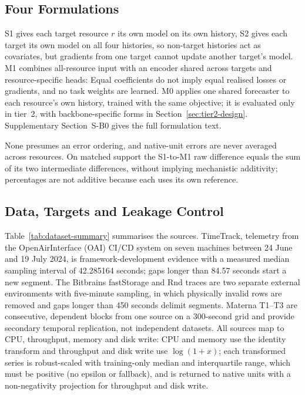 \subsection{Four Formulations}
\label{sec:formulations}
\label{sec:s1}
\label{sec:s2}
\label{sec:m1}
\label{sec:m0}

S1 gives each target resource $r$ its own model on its own history,
S2 gives each target its own model on all four histories,
so non-target histories act as covariates, but gradients from one target
cannot update another target's model. M1 combines all-resource input with an
encoder shared across targets and resource-specific heads:
Equal coefficients do not imply equal realised losses or gradients, and no
task weights are learned. M0 applies one shared forecaster to each resource's
own history,
trained with the same objective; it is evaluated only in tier~2, with
backbone-specific forms in Section~\ref{sec:tier2-design}. Supplementary
Section~S-B0 gives the full formulation text.

None presumes an error ordering, and native-unit errors are never averaged
across resources. On matched support the S1-to-M1 raw difference equals the
sum of its two intermediate differences, without implying mechanistic
additivity; percentages are not additive because each uses its own reference.


\subsection{Data, Targets and Leakage Control}
\label{sec:datasets}
\label{sec:preprocessing}
\label{sec:leakage-control}
\label{sec:population-restrictions}
\label{sec:replication-design}

Table~\ref{tab:dataset-summary} summarises the sources. TimeTrack, telemetry
from the OpenAirInterface (OAI) CI/CD system on seven machines between
24 June and 19 July 2024, is framework-development evidence with a measured
median sampling interval of 42.285164 seconds; gaps longer than 84.57 seconds
start a new segment. The Bitbrains fastStorage and Rnd traces are two separate
external environments with five-minute sampling, in which physically invalid
rows are removed and gaps longer than 450 seconds delimit segments. Materna
T1--T3 are consecutive, dependent blocks from one source on a 300-second grid
and provide secondary temporal replication, not independent datasets. All
sources map to CPU, throughput, memory and disk write: CPU and memory use the
identity transform and throughput and disk write use $\log(1+x)$; each
transformed series is robust-scaled with training-only median and
interquartile range, which must be positive (no epsilon or fallback), and is
returned to native units with a non-negativity projection for throughput and
disk write.

